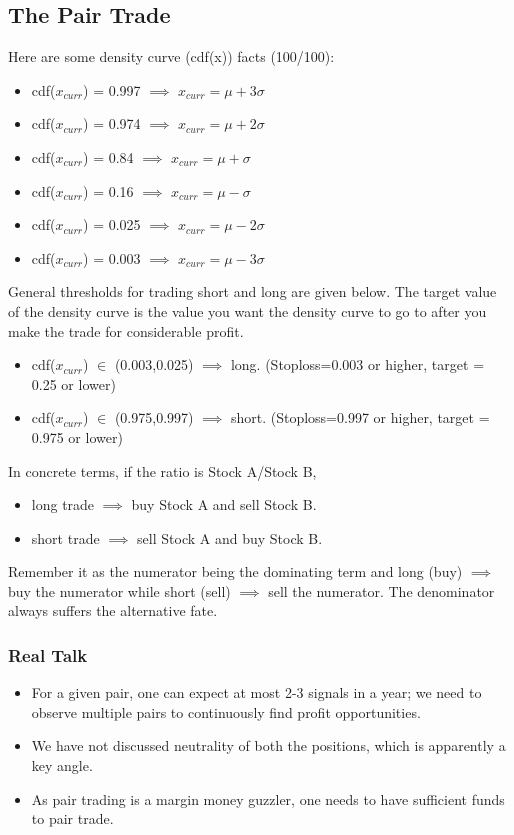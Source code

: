 \documentclass{article}
\begin{document}
\subsection{The Pair Trade}
Here are some density curve (cdf(x)) facts (100/100):
\begin{itemize}
    \item cdf($x_{curr}$) = 0.997 $\implies$ $x_{curr} = \mu+3\sigma$
    \item cdf($x_{curr}$) = 0.974 $\implies$ $x_{curr} = \mu+2\sigma$
    \item cdf($x_{curr}$) = 0.84 $\implies$ $x_{curr} = \mu+\sigma$
    \item cdf($x_{curr}$) = 0.16 $\implies$ $x_{curr} = \mu-\sigma$
    \item cdf($x_{curr}$) = 0.025 $\implies$ $x_{curr} = \mu-2\sigma$
    \item cdf($x_{curr}$) = 0.003 $\implies$ $x_{curr} = \mu-3\sigma$
\end{itemize}
General thresholds for trading short and long are given below. The target
value of the density curve is the value you want the density curve to go to
after you make the trade for considerable profit.
\begin{itemize}
    \item cdf($x_{curr}$) $\in$ (0.003,0.025) $\implies$ long.
    (Stoploss=0.003 or higher, target = 0.25 or lower)
    \item cdf($x_{curr}$) $\in$ (0.975,0.997) $\implies$ short.
    (Stoploss=0.997 or higher, target = 0.975 or lower)
\end{itemize}
In concrete terms, if the ratio is Stock A/Stock B,
\begin{itemize}
    \item long trade $\implies$ buy Stock A and sell Stock B.
    \item short trade $\implies$ sell Stock A and buy Stock B.
\end{itemize}
Remember it as the numerator being the dominating term and long (buy) $\implies$
buy the numerator while short (sell) $\implies$ sell the numerator. The
denominator always suffers the alternative fate.
\subsubsection{Real Talk}
\begin{itemize}
    \item For a given pair, one can expect at most 2-3 signals in a year; we need to observe multiple pairs to continuously find profit opportunities.
    \item We have not discussed neutrality of both the positions, which is apparently a key angle.
    \item As pair trading is a margin money guzzler, one needs to have sufficient funds to pair trade.
\end{itemize}
\end{document}
